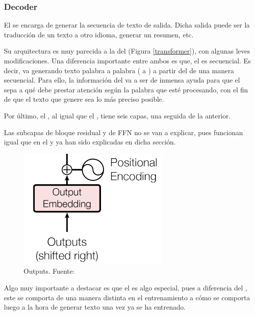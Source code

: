 \subsubsection{Decoder}
El  se encarga de generar la secuencia de texto de salida. Dicha salida puede ser la traducción de un texto a otro idioma, generar un resumen, etc. 

Su arquitectura es muy parecida a la del  (Figura \ref{transformer}), con algunas leves modificaciones. Una diferencia importante entre ambos es que, el  es secuencial. Es decir, va generando texto palabra a palabra ( a ) a partir del  de una manera secuencial. Para ello, la información del  va a ser de inmensa ayuda para que el  sepa a qué debe prestar atención según la palabra que esté procesando, con el fin de que  el texto que genere sea lo más preciso posible.

Por último, el , al igual que el , tiene seis capas, una seguida de la anterior.
\begin{nota}
    Las subcapas de bloque residual y de FFN no se van a explicar, pues funcionan igual que en el  y ya han sido explicadas en dicha sección.
\end{nota}

\begin{figure}[H]
    \centering
    \includegraphics{imgs/trans_arq_3.png}
    \caption{Outputs. \scriptsize{Fuente: \parencite{transformers}}}
    \label{outputs}
\end{figure}

Algo muy importante a destacar es que el  es algo especial, pues a diferencia del , este se comporta de una manera distinta en el entrenamiento a cómo se comporta luego a la hora de generar texto una vez ya se ha entrenado. 

